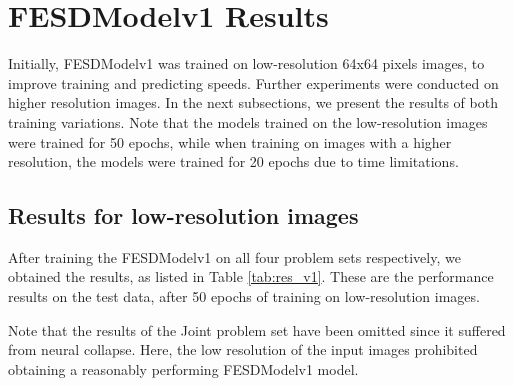 \section{FESDModelv1 Results}
\label{sec:FESDModelv1_results}

Initially, FESDModelv1 was trained on low-resolution 64x64 pixels images, to improve training and predicting speeds. Further experiments were conducted on higher resolution images. In the next subsections, we present the results of both training variations. Note that the models trained on the low-resolution images were trained for 50 epochs, while when training on images with a higher resolution, the models were trained for 20 epochs due to time limitations.

\subsection{Results for low-resolution images}

After training the FESDModelv1 on all four problem sets respectively, we obtained the results, as listed in Table \ref{tab:res_v1}. These are the performance results on the test data, after 50 epochs of training on low-resolution images.

Note that the results of the Joint problem set have been omitted since it suffered from neural collapse. Here, the low resolution of the input images prohibited obtaining a reasonably performing FESDModelv1 model.



